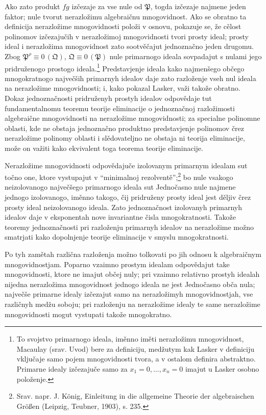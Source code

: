 \documentclass[11pt]{article}
\newcommand{\ideal}[1]{\mathfrak{#1}}
\newcommand{\eqzero}[1]{\equiv 0\,(#1)}
\begin{document}
Ako zato produkt \(fg\) izčezaje za vse nule od \(\ideal P\), togda izčezaje najmene jeden faktor; nule tvorut nerazložimu algebraičnu mnogovidnost. Ako se obratno ta definicija nerazložime mnogovidnosti položi v osnovu, pokazuje se, že cělost polinomov izčezajučih v nerazložimoj mnogovidnosti tvori prosty ideal; prosty ideal i nerazložima mnogovidnost zato sootvěčajut jednoznačno jeden drugomu. Zbog \(\ideal P^\rho\eqzero{\ideal Q}\), \(\ideal Q\eqzero{\ideal P}\) nule primarnogo ideala sovpadajut s nulami jego pridruženogo prostogo ideala.\footnote{To svojstvo primarnogo ideala, iměnno iměti nerazložimu mnogovidnost, Macaulay (srav. Uvod) bere za definiciju, medžutym kak Lasker v definiciju vključaje samo pojem mnogovidnosti tvora, a v ostalom definira abstraktno. Primarne idealy izčezajuče samo za \(x_1=0,
\ldots,x_n=0\) imajut u Lasker osobno položenje.} Predstavjenje ideala kako najmenšego občego mnogokratnogo največših primarnyh idealov daje zato razloženje vseh nul ideala na nerazložime mnogovidnosti; i, kako pokazal Lasker, važi takože obratno. Dokaz jednoznačnosti pridruženyh prostyh idealov odpovědaje tut fundamentalnomu teoremu teorije eliminacije o jednoznačnoj razložimosti algebraične mnogovidnosti na nerazložime mnogovidnosti; za specialne polinomne oblasti, kde ne obstaja jednoznačno produktno predstavjenje polinomov črez nerazložime polinomy oblasti i slědovateljno ne obstaja ni teorija eliminacije, može on važiti kako ekvivalent toga teorema teorije eliminacije.

Nerazložime mnogovidnosti odpovědajuče izolovanym primarnym idealam sut točno one, ktore vystupajut v ``minimalnoj rezolventě'';\footnote{Srav. napr. J. König, Einleitung in die allgemeine Theorie der algebraischen Größen (Leipzig, Teubner, 1903), s. 235.} bo nule vsakogo neizolovanogo največšego primarnogo ideala sut Jednočasno nule najmene jednogo izolovanogo, iměnno takogo, čij pridruženy prosty ideal jest děljiv črez prosty ideal neizolovanogo ideala. Zato jednoznačnost izolovanyh primarnyh idealov daje v eksponentah nove invariantne čisla mnogokratnosti. Takože teoremy jednoznačnosti pri razloženju primarnyh idealov na nerazložime možno smatrjati kako dopolnjenje teorije eliminacije v smyslu mnogokratnosti.

Po tyh zamětah različna razloženja možno tolkovati po jih odnosu k algebraičnym mnogovidnostjam. Poparno vzaimno prostym idealam odpovědajut take mnogovidnosti, ktore ne imajut občej nuly; pri vzaimno relativno prostyh idealah nijedna nerazložima mnogovidnost jednogo ideala ne jest Jednočasno obča nula; največše primarne idealy izčezajut samo na nerazložimyh mnogovidnostjah, vse različnyh medžu soboju; pri razloženju na nerazložime idealy te same nerazložime mnogovidnosti mogut vystupati takože mnogokratno.
\end{document}
